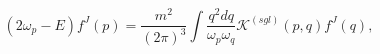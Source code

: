 \begin{equation}
\left( 2\omega _{p}-E\right) f^{J}(p)=\frac{m^{2}}{\left( 2\pi \right) ^{3}}%
\int \frac{q^{2}dq}{\omega _{p}\omega _{q}}\mathcal{K}^{\left( sgl\right)
}\left( p,q\right) f^{J}(q),
\end{equation}

